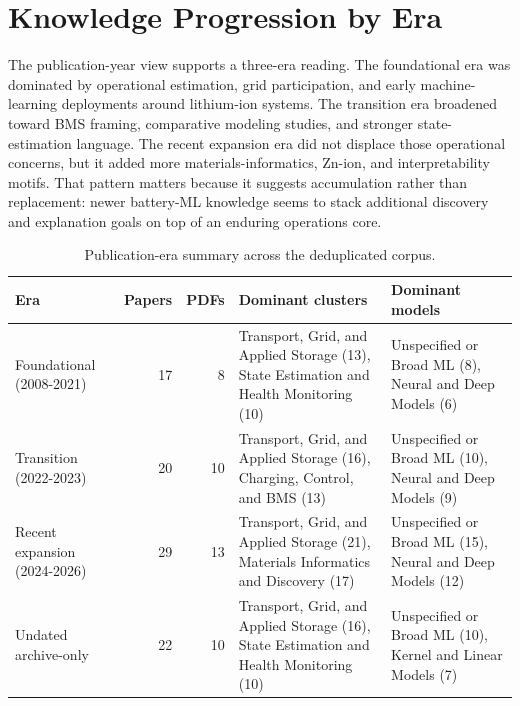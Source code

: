 \documentclass[journal]{IEEEtran}
\begin{document}
\section{Knowledge Progression by Era}
The publication-year view supports a three-era reading. The foundational era \cite{participationofbattery2020,acceleratingfunctionalma2013,machinelearningbased2021,machinelearningsystems2018} was dominated by operational estimation, grid participation, and early machine-learning deployments around lithium-ion systems. The transition era \cite{stateestimationof2023,onlineconditionmonitorin2022,socestimationof2023,textminingfor2022} broadened toward BMS framing, comparative modeling studies, and stronger state-estimation language. The recent expansion era \cite{machinelearningdriven2025,recentadvancesin2025,interpretablemachinelear2025,datadrivenapproaches2024,predictivedesignof2024} did not displace those operational concerns, but it added more materials-informatics, Zn-ion, and interpretability motifs. That pattern matters because it suggests accumulation rather than replacement: newer battery-ML knowledge seems to stack additional discovery and explanation goals on top of an enduring operations core.

\begin{table}[t]
\caption{Publication-era summary across the deduplicated corpus.}
\label{tab:era_summary}
\centering
\footnotesize
\begin{tabularx}{\linewidth}{lrrXX}
\toprule
Era & Papers & PDFs & Dominant clusters & Dominant models \\
\midrule
Foundational (2008-2021) & 17 & 8 & Transport, Grid, and Applied Storage (13), State Estimation and Health Monitoring (10) & Unspecified or Broad ML (8), Neural and Deep Models (6) \\
Transition (2022-2023) & 20 & 10 & Transport, Grid, and Applied Storage (16), Charging, Control, and BMS (13) & Unspecified or Broad ML (10), Neural and Deep Models (9) \\
Recent expansion (2024-2026) & 29 & 13 & Transport, Grid, and Applied Storage (21), Materials Informatics and Discovery (17) & Unspecified or Broad ML (15), Neural and Deep Models (12) \\
Undated archive-only & 22 & 10 & Transport, Grid, and Applied Storage (16), State Estimation and Health Monitoring (10) & Unspecified or Broad ML (10), Kernel and Linear Models (7) \\
\bottomrule
\end{tabularx}
\end{table}
\end{document}
